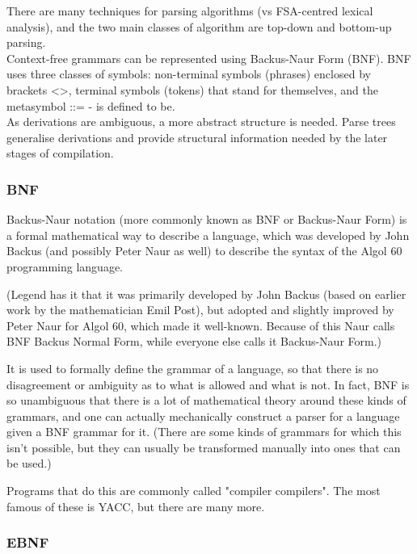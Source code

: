 There are many techniques for parsing algorithms (vs FSA-centred lexical analysis), and the two main classes of algorithm are top-down and bottom-up parsing.\\

Context-free grammars can be represented using Backus-Naur Form (BNF). BNF uses three classes of symbols: non-terminal symbols (phrases) enclosed by brackets <>, terminal symbols (tokens) that stand for themselves, and the metasymbol ::= - is defined to be.\\

As derivations are ambiguous, a more abstract structure is needed. Parse trees generalise derivations and provide structural information needed by the later stages of compilation.

\subsubsection{BNF} 

Backus-Naur notation (more commonly known as BNF or Backus-Naur Form) is a formal mathematical way to describe a language, which was developed by John Backus (and possibly Peter Naur as well) to describe the syntax of the Algol 60 programming language.

(Legend has it that it was primarily developed by John Backus (based on earlier work by the mathematician Emil Post), but adopted and slightly improved by Peter Naur for Algol 60, which made it well-known. Because of this Naur calls BNF Backus Normal Form, while everyone else calls it Backus-Naur Form.)

It is used to formally define the grammar of a language, so that there is no disagreement or ambiguity as to what is allowed and what is not. In fact, BNF is so unambiguous that there is a lot of mathematical theory around these kinds of grammars, and one can actually mechanically construct a parser for a language given a BNF grammar for it. (There are some kinds of grammars for which this isn't possible, but they can usually be transformed manually into ones that can be used.)

Programs that do this are commonly called "compiler compilers". The most famous of these is YACC, but there are many more.



\subsubsection{EBNF}

